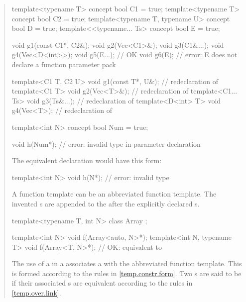 \begin{quote}
\begin{codeblock}
template<typename T> concept bool C1 = true;
template<typename T> concept bool C2 = true;
template<typename T, typename U> concept bool D = true;
template<<typename... Ts> concept bool E = true;

void g1(const C1*, C2&);
void g2(Vec<C1>&);
void g3(C1&...);
void g4(Vec<D<int>>);
void g5(E...); // OK
void g6(E);    // error: E does not declare a function parameter pack

template<C1 T, C2 U> void g1(const T*, U&); // redeclaration of 
template<C1 T> void g2(Vec<T>&);            // redeclaration of 
template<C1... Ts> void g3(Ts&...);         // redeclaration of 
template<D<int> T> void g4(Vec<T>);         // redeclaration of 
\end{codeblock}
\exitexample

\enterexample
\begin{codeblock}
template<int N> concept bool Num = true;

void h(Num*); // error: invalid type in parameter declaration
      \end{codeblock}
The equivalent declaration would have this form:
      \begin{codeblock}
template<int N> void h(N*); // error: invalid type
\end{codeblock}
\exitexample

\pnum
A function template can be an abbreviated function template. The 
invented s are appended to the 
 after the explicitly declared 
s.

\enterexample
\begin{codeblock}
template<typename T, int N> class Array { };

template<int N> void f(Array<auto, N>*);
template<int N, typename T> void f(Array<T, N>*); // OK: equivalent to 
\end{codeblock}
\exitexample

\pnum
The use of a  in a 
 associates a 
 with the abbreviated function template. 
% 
This  is formed according to the rules 
in \ref{temp.constr.form}.
% 
Two s are said to be 
 if their associated s are
equivalent according to the rules in \ref{temp.over.link}.



\end{quote}

